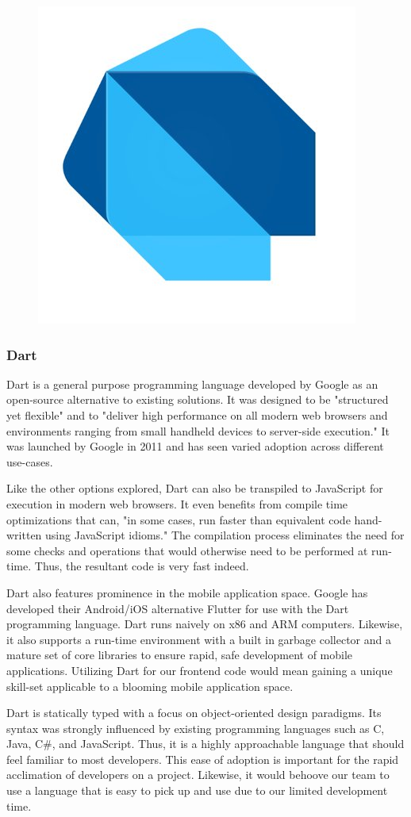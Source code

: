 \documentclass[12pt]{article}
\begin{document}
\begin{figure}[h]
	\centering
	\includegraphics[width=0.25\linewidth]{dart}
\end{figure}

\subsubsection{Dart}

Dart is a general purpose programming language developed by Google as an open-source alternative to existing solutions.\cite{dartlaunch} It was designed to be "structured yet flexible" and to "deliver high performance on all modern web browsers and environments ranging from small handheld devices to server-side execution."\cite{dartlaunch} It was launched by Google in 2011 and has seen varied adoption across different use-cases.

Like the other options explored, Dart can also be transpiled to JavaScript for execution in modern web browsers. It even benefits from compile time optimizations that can, "in some cases, run faster than equivalent code hand-written using JavaScript idioms."\cite{darttalk} The compilation process eliminates the need for some checks and operations that would otherwise need to be performed at run-time. Thus, the resultant code is very fast indeed.

Dart also features prominence in the mobile application space. Google has developed their Android/iOS alternative Flutter for use with the Dart programming language.\cite{darthomepage} Dart runs naively on x86 and ARM computers. Likewise, it also supports a run-time environment with a built in garbage collector and a mature set of core libraries to ensure rapid, safe development of mobile applications. Utilizing Dart for our frontend code would mean gaining a unique skill-set applicable to a blooming mobile application space.

Dart is statically typed with a focus on object-oriented design paradigms. Its syntax was strongly influenced by existing programming languages such as C, Java, C\#, and JavaScript. Thus, it is a highly approachable language that should feel familiar to most developers. This ease of adoption is important for the rapid acclimation of developers on a project. Likewise, it would behoove our team to use a language that is easy to pick up and use due to our limited development time.
\end{document}
